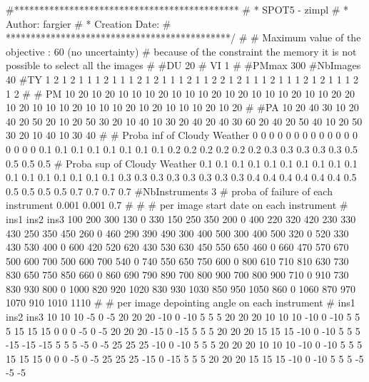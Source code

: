 #*********************************************
# * SPOT5 - zimpl
# * Author: fargier
# * Creation Date:
# *********************************************/
#
# Maximum value of the objective : 60 (no uncertainty)
# because of the constraint the memory it is not possible to select all the images
#
#DU
20
# VI
1
#
#PMmax
300
#NbImages
40
#TY
1
2
1
2
1
1
1
2
1
1
1
2
1
2
1
1
1
2
1
1
2
2
1
2
1
1
1
2
1
1
1
2
1
2
1
1
1
2
1
2
#
# PM
10
20
10
20
10
10
10
20
10
10
10
20
10
20
10
10
10
20
10
10
20
20
10
20
10
10
10
20
10
10
10
20
10
20
10
10
10
20
10
20
#
#PA
10
20
40
30
10
20
40
20
50
20
10
20
50
30
20
10
40
10
30
20
40
20
40
30
60
20
40
20
50
40
10
20
50
30
20
10
40
10
30
40
#
# Proba inf of Cloudy Weather
0
0
0
0
0
0
0
0
0
0
0
0
0
0
0
0
0
0.1
0.1
0.1
0.1
0.1
0.1
0.1
0.1
0.2
0.2
0.2
0.2
0.2
0.2
0.3
0.3
0.3
0.3
0.3
0.5
0.5
0.5
0.5
# Proba sup of Cloudy Weather
0.1
0.1
0.1
0.1
0.1
0.1
0.1
0.1
0.1
0.1
0.1
0.1
0.1
0.1
0.1
0.1
0.1
0.3
0.3
0.3
0.3
0.3
0.3
0.3
0.3
0.4
0.4
0.4
0.4
0.4
0.4
0.5
0.5
0.5
0.5
0.5
0.7
0.7
0.7
0.7
#NbInstruments
3
# proba of failure of each instrument
0.001
0.001
0.7
#
#
# per image start date on each instrument
# ins1 ins2 ins3
100 200 300
130 0 330
150 250 350
200 0 400
220 320 420
230 330 430
250 350 450
260 0 460
290 390 490
300 400 500
300 400 500
320 0 520
330 430 530
400 0 600
420 520 620
430 530 630
450 550 650
460 0 660
470 570 670
500 600 700
500 600 700
540 0 740
550 650 750
600 0 800
610 710 810
630 730 830
650 750 850
660 0 860
690 790 890
700 800 900
700 800 900
710 0 910
730 830 930
800 0 1000
820 920 1020
830 930 1030
850 950 1050
860 0 1060
870 970 1070
910 1010 1110
#
# per image depointing angle on each instrument
# ins1 ins2 ins3
10 10 10
-5 0 -5
20 20 20
-10 0 -10
5 5 5
20 20 20
10 10 10
-10 0 -10
5 5 5
15 15 15
0 0 0
-5 0 -5
20 20 20
-15 0 -15
5 5 5
20 20 20
15 15 15
-10 0 -10
5 5 5
-15 -15 -15
5 5 5
-5 0 -5
25 25 25
-10 0 -10
5 5 5
20 20 20
10 10 10
-10 0 -10
5 5 5
15 15 15
0 0 0
-5 0 -5
25 25 25
-15 0 -15
5 5 5
20 20 20
15 15 15
-10 0 -10
5 5 5
-5 -5 -5


